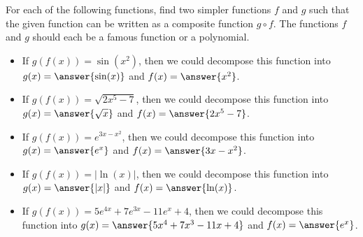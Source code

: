 \documentclass{ximera}
\author{Elizabeth Miller}
\begin{document}
\licenseAPC
\begin{exercise}

For each of the following functions, find two simpler functions $f$ and $g$ such that the given function can be written as a composite function $g \circ f$.  The functions $f$ and $g$ should each be a famous function or a polynomial.

\begin{itemize}
\item If $g(f(x))=\sin(x^2)$, then we could decompose this function into $g(x)=\answer{\sin(x)}$ and $f(x)=\answer{x^2}$.
\item If $g(f(x))=\sqrt{2x^5-7}$, then we could decompose this function into $g(x)=\answer{\sqrt{x}}$ and $f(x)=\answer{2x^5-7}$.
\item If $g(f(x))=e^{3x-x^2}$, then we could decompose this function into $g(x)=\answer{e^x}$ and $f(x)=\answer{3x-x^2}$.
\item If $g(f(x))=|\ln(x)|$, then we could decompose this function into $g(x)=\answer{|x|}$ and $f(x)=\answer{\ln(x)}$.
\item If $g(f(x))=5e^{4x}+7e^{3x}-11e^x+4$, then we could decompose this function into $g(x)=\answer{5x^4+7x^3-11x+4}$ and $f(x)=\answer{e^x}$.
\end{itemize}

\end{exercise}
\end{document}
